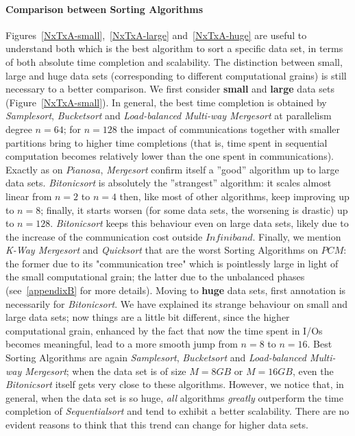 \paragraph{Comparison between Sorting Algorithms}
Figures~\ref{NxTxA-small},~\ref{NxTxA-large} and~\ref{NxTxA-huge} are useful to understand both which is the best algorithm to sort a specific data set, in terms of both absolute time completion and scalability. The distinction between small, large and huge data sets (corresponding to different computational grains) is still necessary to a better comparison. We first consider \textbf{small} and \textbf{large} data sets (Figure~\ref{NxTxA-small}). In general, the best time completion is obtained by \textit{Samplesort}, \textit{Bucketsort} and \textit{Load-balanced Multi-way Mergesort} at parallelism degree $n=64$; for $n=128$ the impact of communications together with smaller partitions bring to higher time completions (that is, time spent in sequential computation becomes relatively lower than the one spent in communications). Exactly as on $Pianosa$, \textit{Mergesort} confirm itself a ''good'' algorithm up to large data sets. \textit{Bitonicsort} is absolutely the ''strangest'' algorithm: it scales almost linear from $n=2$ to $n=4$ then, like most of other algorithms, keep improving up to $n=8$; finally, it starts worsen (for some data sets, the worsening is drastic) up to $n=128$. \textit{Bitonicsort} keeps this behaviour even on large data sets, likely due to the increase of the communication cost outside $Infiniband$. Finally, we mention \textit{K-Way Mergesort} and \textit{Quicksort} that are the worst Sorting Algorithms on $PCM$: the former due to its "communication tree" which is pointlessly large in light of the small computational grain; the latter due to the unbalanced phases (see~\ref{appendixB} for more details). Moving to \textbf{huge} data sets, first annotation is necessarily for \textit{Bitonicsort}. We have explained its strange behaviour on small and large data sets; now things are a little bit different, since the higher computational grain, enhanced by the fact that now the time spent in I/Os becomes meaningful, lead to a more smooth jump from $n=8$ to $n=16$. Best Sorting Algorithms are again \textit{Samplesort}, \textit{Bucketsort} and \textit{Load-balanced Multi-way Mergesort}; when the data set is of size $M=8GB$ or $M=16GB$, even the \textit{Bitonicsort} itself gets very close to these algorithms. However, we notice that, in general, when the data set is so huge, \textit{all} algorithms \textit{greatly} outperform the time completion of \textit{Sequentialsort} and tend to exhibit a better scalability. There are no evident reasons to think that this trend can change for higher data sets.

